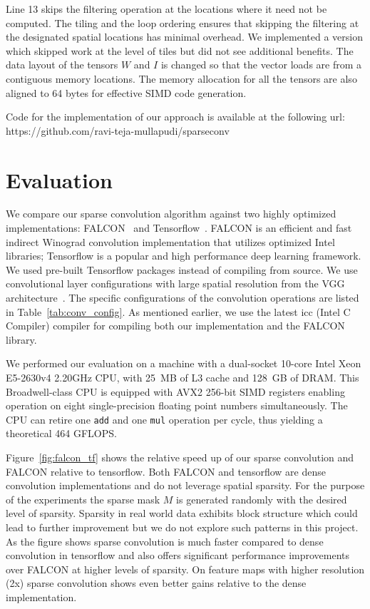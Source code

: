 \documentclass{article}
\begin{document}
Line 13 skips the filtering operation at the locations where it need not be
computed. The tiling and the loop ordering ensures that skipping the filtering
at the designated spatial locations has minimal overhead. We implemented a
version which skipped work at the level of tiles but did not see additional
benefits. The data layout of the tensors $W$ and $I$ is changed so that the
vector loads are from a contiguous memory locations. The memory allocation for
all the tensors are also aligned to 64 bytes for effective SIMD code generation.

Code for the implementation of our approach is available at the following url:
https://github.com/ravi-teja-mullapudi/sparseconv

\section{Evaluation}
\label{sec:eval}
We compare our sparse convolution algorithm against two highly optimized
implementations: FALCON~\cite{falcon} and Tensorflow~\cite{tensorflow}.  FALCON
is an efficient and fast indirect Winograd convolution implementation that
utilizes optimized Intel libraries; Tensorflow is a popular and high performance
deep learning framework. We used pre-built Tensorflow packages instead of
compiling from source. We use convolutional layer configurations with large
spatial resolution from the VGG architecture~\cite{simonyan2014very}.  The
specific configurations of the convolution operations are listed in
Table~\ref{tab:conv_config}. As mentioned earlier, we use the latest icc (Intel
C Compiler) compiler for compiling both our implementation and the FALCON
library. 

We performed our evaluation on a machine with a dual-socket 10-core Intel 
Xeon E5-2630v4 2.20GHz CPU, with 25~MB of L3 cache and 128~GB of DRAM. This 
Broadwell-class CPU is equipped with AVX2 256-bit SIMD registers enabling
operation on eight single-precision floating point numbers simultaneously. 
The CPU can retire one \texttt{add} and one \texttt{mul} operation per cycle,
thus yielding a theoretical 464 GFLOPS.

Figure~\ref{fig:falcon_tf} shows the relative speed up of our sparse convolution
and FALCON relative to tensorflow. Both FALCON and tensorflow are dense
convolution implementations and do not leverage spatial sparsity. For the
purpose of the experiments the sparse mask $M$ is generated randomly with the
desired level of sparsity. Sparsity in real world data exhibits block structure
which could lead to further improvement but we do not explore such patterns in
this project. As the figure shows sparse convolution is much faster compared to
dense convolution in tensorflow and also offers significant performance
improvements over FALCON at higher levels of sparsity. On feature maps with
higher resolution (2x) sparse convolution shows even better gains relative to
the dense implementation.
\end{document}

